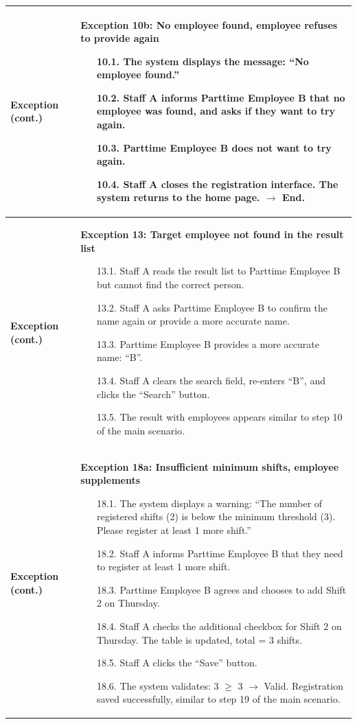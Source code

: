 \begin{longtable}{|p{3cm}|p{13cm}|}
\textbf{Exception (cont.)} &
\textbf{Exception 10b: No employee found, employee refuses to provide again}
\begin{enumerate}
    \item[10.1.] The system displays the message: ``No employee found.''
    \item[10.2.] Staff A informs Parttime Employee B that no employee was found, and asks if they want to try again.
    \item[10.3.] Parttime Employee B does not want to try again.
    \item[10.4.] Staff A closes the registration interface. The system returns to the home page. $\rightarrow$ End.
\end{enumerate} \\
\hline

\textbf{Exception (cont.)} &
\textbf{Exception 13: Target employee not found in the result list}
\begin{enumerate}
    \item[13.1.] Staff A reads the result list to Parttime Employee B but cannot find the correct person.
    \item[13.2.] Staff A asks Parttime Employee B to confirm the name again or provide a more accurate name.
    \item[13.3.] Parttime Employee B provides a more accurate name: ``B''.
    \item[13.4.] Staff A clears the search field, re-enters ``B'', and clicks the ``Search'' button.
    \item[13.5.] The result with employees appears similar to step 10 of the main scenario.
\end{enumerate} \\
\hline

\textbf{Exception (cont.)} &
\textbf{Exception 18a: Insufficient minimum shifts, employee supplements}
\begin{enumerate}
    \item[18.1.] The system displays a warning: ``The number of registered shifts (2) is below the minimum threshold (3). Please register at least 1 more shift.''
    \item[18.2.] Staff A informs Parttime Employee B that they need to register at least 1 more shift.
    \item[18.3.] Parttime Employee B agrees and chooses to add Shift 2 on Thursday.
    \item[18.4.] Staff A checks the additional checkbox for Shift 2 on Thursday. The table is updated, total = 3 shifts.
    \item[18.5.] Staff A clicks the ``Save'' button.
    \item[18.6.] The system validates: 3 $\geq$ 3 $\rightarrow$ Valid. Registration saved successfully, similar to step 19 of the main scenario.
\end{enumerate} \\
\hline


\end{longtable}
